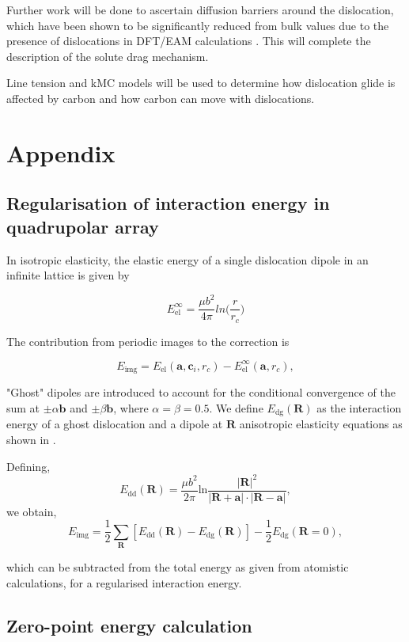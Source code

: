 \documentclass[a4paper,11pt]{article}
\begin{document}
Further work will be done to ascertain diffusion barriers around the dislocation, which have been
shown to be significantly reduced from bulk values due to the presence of dislocations in DFT/EAM
calculations \cite{Nematollahi2016}. This will complete the description of the solute drag mechanism.

Line tension and kMC models will be used to determine how dislocation glide is affected by carbon
and how carbon can move with dislocations. 


\section{Appendix}
\label{sec:org8167ee3}
\subsection{Regularisation of interaction energy in quadrupolar array}
\label{sec:org18ec16a}
\label{sec:Ainteractionenergy}


In isotropic elasticity, the elastic energy of a single dislocation dipole in an
infinite lattice is given by


\[ E_{\text{el}}^{\infty} = \frac{\mu b^2}{4\pi} ln \big( \frac{r}{r_{c}} \big)  \]

The contribution from periodic images to the correction is 

\[ E_{\text{img} } = E_{\text{el}} (\mathbf{a}, \mathbf{c}_i , r_c) - E_{\text{el}}^{\infty}
   (\mathbf{a}, r_c),\]

"Ghost" dipoles are introduced to account for the conditional convergence of the sum at \(\pm\alpha
   \mathbf{b}\) and \(\pm \beta\mathbf{b}\), where \(\alpha = \beta = 0.5\). We define \(E_{\text{dg}} (\mathbf{R})\) as the
interaction energy of a ghost dislocation and a dipole at \(\mathbf{R}\) anisotropic elasticity
equations as shown in \cite{Cai2003}.


Defining, 
 \[ E_{\text{dd}} (\mathbf{R}) = \frac{\mu b^2}{2\pi}
   \text{ln}\frac{|\mathbf{R}|^2}{|\mathbf{R}+\mathbf{a}|\cdot|\mathbf{R}-\mathbf{a}|},
   \]
we obtain,
\[ E_{\text{img}} = \frac{1}{2}\sum_{\mathbf{R}} [ E_{\text{dd}} (\mathbf{R}) - E_{\text{dg}} (\mathbf{R}) ] - \frac{1}{2}
   E_{\text{dg}} (\mathbf{R} = 0),  \]

which can be subtracted from the total energy as given from atomistic calculations, for a
regularised interaction energy. 


\subsection{Zero-point energy calculation}
\label{sec:orga1756c8}
\label{sec:zeropointenergy}
\end{document}
